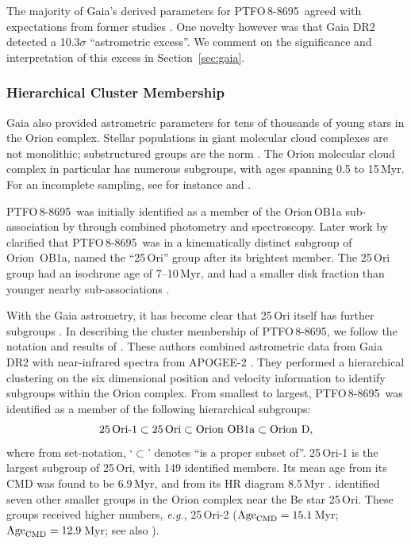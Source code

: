 \documentclass[12pt,twocolumn,tighten]{aastex62}
\newcommand{\ptfo}{PTFO$\,$8-8695}
\begin{document}
The majority of Gaia's derived parameters for \ptfo\ agreed with
expectations from former studies
\citep{briceno_cida_2005,van_eyken_ptf_2012}.  One novelty however was
that Gaia DR2 detected a 10.3$\sigma$ ``astrometric excess''.
We comment on the significance and
interpretation of this excess in Section~\ref{sec:gaia}.


\subsubsection{Hierarchical Cluster Membership}
\label{subsec:hierarchical}

Gaia also provided astrometric parameters for tens of thousands of
young stars in the Orion complex.  Stellar populations in giant
molecular cloud complexes are not monolithic; substructured groups are
the norm \citep{briceno_lowmassOB_2007}.  The Orion molecular cloud
complex in particular has numerous subgroups, with ages spanning 0.5
to 15$\,$Myr. For an incomplete sampling, see for instance
\citet{briceno_cida_2005,jeffries_kinematic_2006,briceno_25_2007,kounkel_apogee2_2018}
and \citet{briceno_cidaII_2019}.

\ptfo\ was initially identified as a member of the Orion$\,$OB1a
sub-association by \citet{briceno_cida_2005} through combined
photometry and spectroscopy.  Later work by \citet{briceno_25_2007}
clarified that \ptfo\ was in a kinematically distinct subgroup of
Orion~OB1a, named the ``25$\,$Ori'' group after its brightest
member. The 25$\,$Ori group had an isochrone age of 7--10$\,$Myr, and
had a smaller disk fraction than younger nearby sub-associations
\citep{hernandez_spitzer_ob1_2007}.

With the Gaia astrometry, it has become clear that 25$\,$Ori itself
has further subgroups
\citep{kounkel_apogee2_2018,briceno_cidaII_2019}.  In describing the
cluster membership of \ptfo, we follow the notation and results of
\citet{kounkel_apogee2_2018}.  These authors combined astrometric data
from Gaia DR2 with near-infrared spectra from APOGEE-2
\citep{gunn_sdss_2006,majewski_apache_2017,blanton_sloan_2017,zasowski_target_2017,cottle_apogee2_2018}.
They performed a hierarchical clustering on the six dimensional
position and velocity information to identify subgroups within the
Orion complex.  From smallest to largest, \ptfo\ was identified
as a member of the following hierarchical subgroups:
\begin{equation}
  {\rm 25\,Ori\text{-}1}
  \subset {\rm 25\,Ori}
  \subset {\rm Orion\ OB1a}
  \subset {\rm Orion\ D},
\end{equation}
where from set-notation, `$\subset$' denotes ``is a proper subset
of''.  25$\,$Ori-1 is the largest subgroup of 25$\,$Ori, with 149
identified members.  Its mean age from its CMD was found to be
6.9$\,$Myr, and from its HR diagram 8.5$\,$Myr
\citep{kounkel_apogee2_2018}.  \citet{kounkel_apogee2_2018} identified
seven other smaller groups in the Orion complex near the Be star
25$\,$Ori. These groups received higher numbers, {\it e.g.},
25$\,$Ori-2 (${\rm Age}_{\rm CMD} =15.1\,$Myr; ${\rm Age}_{\rm CMD}
=12.9\,$Myr; see also \citealt{briceno_cidaII_2019}).
\end{document}
